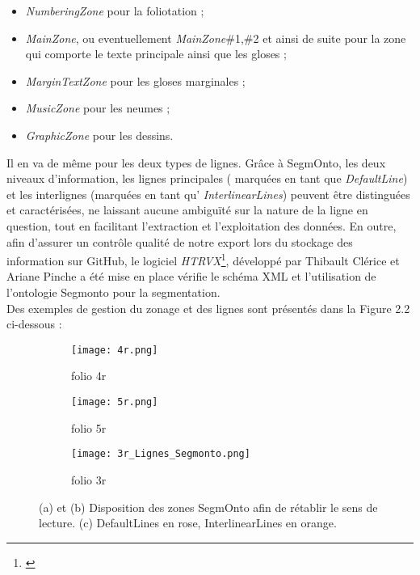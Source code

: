 \documentclass[a4paper, twoside, 12pt]{book}
\begin{document}
\begin{itemize}
    \item \textit{NumberingZone} pour la foliotation ;
    \item \textit{MainZone}, ou eventuellement \textit{MainZone}\#1,\#2 et ainsi de suite pour la zone qui comporte le texte principale ainsi que les gloses ;
    \item \textit{MarginTextZone} pour les gloses marginales ;
    \item \textit{MusicZone} pour les neumes ;
    \item \textit{GraphicZone} pour les dessins.
\end{itemize}

Il en va de même pour les deux types de lignes. Grâce à SegmOnto, les deux niveaux d'information, les lignes principales ( marquées en tant que \textit{DefaultLine}) et les interlignes (marquées en tant qu' \textit{InterlinearLines}) peuvent être distinguées et caractérisées, ne laissant aucune ambiguïté sur la nature de la ligne en question, tout en facilitant l'extraction et l'exploitation des données. En outre, afin d'assurer un contrôle qualité de notre export lors du stockage des information sur GitHub, le logiciel \textit{HTRVX}\footnote{\cite{Clerice_HTRVX_HTR_Validation_2021}}, développé  par Thibault Clérice et Ariane Pinche a été mise en place vérifie le schéma XML et l’utilisation de l’ontologie Segmonto pour la segmentation. \\


Des exemples de gestion du zonage et des lignes sont présentés dans la Figure 2.2  ci-dessous :

\begin{figure}[H]
    \begin{subfigure}{0.40\textwidth}
    \centering
    \texttt{[image: 4r.png]}
    \caption{folio 4r}
    \end{subfigure}
    \begin{subfigure}{0,40\linewidth}
    \centering
    \texttt{[image: 5r.png]}
    \caption{folio 5r}
    \end{subfigure}
     \begin{subfigure}{0,40\linewidth}
    \centering
\texttt{[image: 3r\_Lignes\_Segmonto.png]}
    \caption{ folio 3r }
    \end{subfigure}
    \caption{ (a) et (b) Disposition des zones SegmOnto afin de rétablir le sens de lecture. (c) DefaultLines en rose, InterlinearLines en orange. }
\end{figure} 
\end{document}
